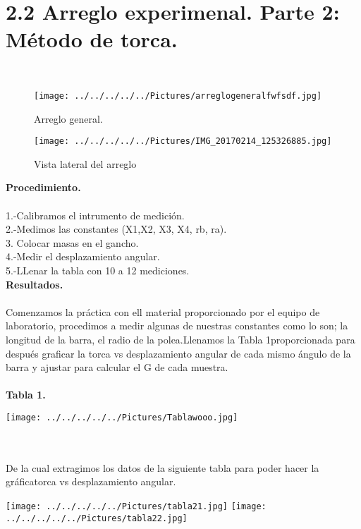 \documentclass[10pt,a4paper]{article}
\begin{document}
\section*{2.2 Arreglo experimenal. Parte 2: M\'{e}todo de torca.} \\

\begin{figure}[hbtp]
\centering
\texttt{[image: ../../../../../Pictures/arreglogeneralfwfsdf.jpg]} 
\caption{Arreglo general.}
\end{figure}

\begin{figure}[hbtp]
\centering
\texttt{[image: ../../../../../Pictures/IMG\_20170214\_125326885.jpg]}  
\caption{Vista lateral del arreglo}
\end{figure}

\pagebreak 

\textbf{Procedimiento.}\\
\\
1.-Calibramos el intrumento de medici\'{o}n.\\
2.-Medimos las constantes (X1,X2, X3, X4, rb, ra).\\
3. Colocar masas en el gancho.\\
4.-Medir el desplazamiento angular.\\
5.-LLenar la tabla con 10 a 12 mediciones.\\

\textbf{Resultados.}\\
\\
Comenzamos la pr\'{a}ctica con ell material proporcionado por el equipo de laboratorio, procedimos a medir algunas de nuestras constantes como lo son; la longitud de la barra, el radio de la polea.Llenamos la Tabla 1proporcionada para despu\'{e}s graficar la torca vs desplazamiento angular de cada mismo \'{a}ngulo de la barra y ajustar para calcular el G de cada muestra.\\
\\
\medskip
\textbf{Tabla 1.}
\\
\begin{figure 2}
\centering
\texttt{[image: ../../../../../Pictures/Tablawooo.jpg]}    
\end{figure 2}
\\
\\
De la cual extragimos los datos de la siguiente tabla para poder hacer la gr\'{a}ficatorca vs desplazamiento angular.
\\
\begin{figure 3}
\centering
\texttt{[image: ../../../../../Pictures/tabla21.jpg]} 
\texttt{[image: ../../../../../Pictures/tabla22.jpg]} 
\\
\caption{\textbf{Tabla 2.}  Datos tabulados para graficar.}
\end{figure 3}
\\
\end{document}
